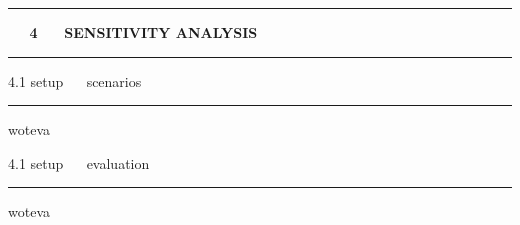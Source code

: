 \documentclass[11pt, compress, t, notes = noshow, xcolor = table, 
aspectratio = 1610]{beamer}
\newcommand{\highlight}[1]{\textcolor{highlightcol}{\textbf{#1}}}
\newcommand{\flexitem}[1]{\item[$\highlight{#1}$]}
\begin{document}
% 
% 


\LARGE
\begin{frame}{\phantom{foo}}
\normalsize
\vspace{-0.5cm}
\noindent \textcolor{gray!90}{\rule{\textwidth}{1pt}}
\smallskip

\Huge
\hspace{0pt}
\vfill
\textbf{\highlight{~~ 4 ~~ SENSITIVITY ANALYSIS}}
\vfill
\hspace{0pt}

\noindent \textcolor{gray!90}{\rule{\textwidth}{1pt}}

\end{frame}


\LARGE
\begin{frame}{\textcolor{gray!90}{4.1 setup} ~~ scenarios}
\normalsize
\vspace{-0.5cm}
\noindent \textcolor{gray!90}{\rule{\textwidth}{1pt}}


\medskip

woteva

\end{frame}


\LARGE
\begin{frame}{\textcolor{gray!90}{4.1 setup} ~~ evaluation}
\normalsize
\vspace{-0.5cm}
\noindent \textcolor{gray!90}{\rule{\textwidth}{1pt}}


\medskip

woteva

\end{frame}
\end{document}

